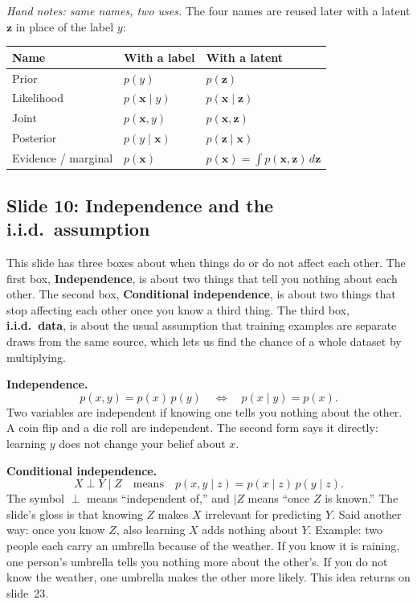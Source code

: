 \textit{Hand notes: same names, two uses.} The four names are reused later with a latent $\mathbf{z}$ in place of the label $y$:

\begin{center}
\begin{tabular}{lll}
\toprule
Name & With a label & With a latent \\
\midrule
Prior & $p(y)$ & $p(\mathbf{z})$ \\
Likelihood & $p(\mathbf{x}\mid y)$ & $p(\mathbf{x}\mid\mathbf{z})$ \\
Joint & $p(\mathbf{x},y)$ & $p(\mathbf{x},\mathbf{z})$ \\
Posterior & $p(y\mid\mathbf{x})$ & $p(\mathbf{z}\mid\mathbf{x})$ \\
Evidence / marginal & $p(\mathbf{x})$ & $p(\mathbf{x})=\int p(\mathbf{x},\mathbf{z})\,d\mathbf{z}$ \\
\bottomrule
\end{tabular}
\end{center}

\subsection*{Slide 10: Independence and the i.i.d.\ assumption}

This slide has three boxes about when things do or do not affect each other. The first box, \textbf{Independence}, is about two things that tell you nothing about each other. The second box, \textbf{Conditional independence}, is about two things that stop affecting each other once you know a third thing. The third box, \textbf{i.i.d.\ data}, is about the usual assumption that training examples are separate draws from the same source, which lets us find the chance of a whole dataset by multiplying.

\textbf{Independence.}
\[
p(x,y)=p(x)\,p(y)\quad\Longleftrightarrow\quad p(x\mid y)=p(x).
\]
Two variables are independent if knowing one tells you nothing about the other. A coin flip and a die roll are independent. The second form says it directly: learning $y$ does not change your belief about $x$.

\textbf{Conditional independence.}
\[
X\perp Y\mid Z\quad\text{means}\quad p(x,y\mid z)=p(x\mid z)\,p(y\mid z).
\]
The symbol $\perp$ means ``independent of,'' and $\mid Z$ means ``once $Z$ is known.'' The slide's gloss is that knowing $Z$ makes $X$ irrelevant for predicting $Y$. Said another way: once you know $Z$, also learning $X$ adds nothing about $Y$. Example: two people each carry an umbrella because of the weather. If you know it is raining, one person's umbrella tells you nothing more about the other's. If you do not know the weather, one umbrella makes the other more likely. This idea returns on slide~23.

